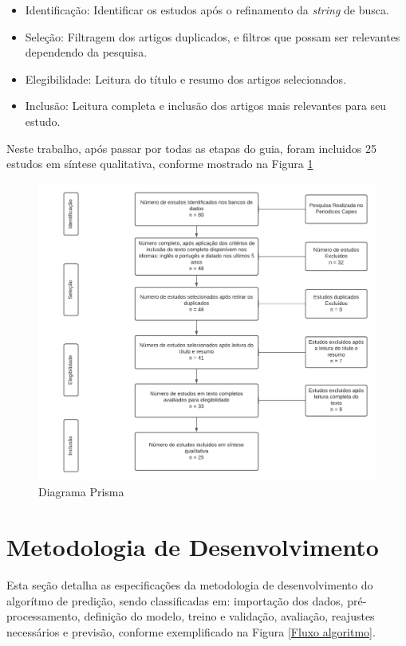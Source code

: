 \begin{itemize}
    \item Identificação: Identificar os estudos após o refinamento da \textit{string} de busca.
    \item Seleção: Filtragem dos artigos duplicados, e filtros que possam ser relevantes dependendo da pesquisa.
    \item Elegibilidade: Leitura do título e resumo dos artigos selecionados.
    \item Inclusão: Leitura completa e inclusão dos artigos mais relevantes para seu estudo.
\end{itemize}

Neste trabalho, após passar por todas as etapas do guia, foram incluidos 25 estudos em síntese qualitativa, conforme mostrado na Figura \ref{prisma}

\begin{figure}[H]
	\centering
	\label{prisma}
		\includegraphics[keepaspectratio=true,scale=0.7]{figuras/Diagrama_Prisma_TCC.png}
	\caption{Diagrama Prisma}
\end{figure}

\section{Metodologia de Desenvolvimento}
\label{md}

Esta seção detalha as especificações da metodologia de desenvolvimento do algorítmo de predição, sendo classificadas em: importação dos dados, pré-processamento, definição do modelo, treino e validação, avaliação, reajustes necessários e previsão, conforme exemplificado na Figura \ref{Fluxo algoritmo}.

